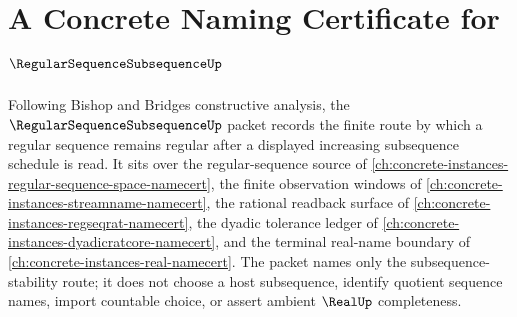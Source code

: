 \chapter{A Concrete Naming Certificate for $\RegularSequenceSubsequenceUp$}
\label{ch:concrete-instances-regular-sequence-subsequence-namecert}

Following Bishop and Bridges constructive analysis, the $\RegularSequenceSubsequenceUp$ packet records the finite route by which a regular sequence remains regular after a displayed increasing subsequence schedule is read. It sits over the regular-sequence source of \autoref{ch:concrete-instances-regular-sequence-space-namecert}, the finite observation windows of \autoref{ch:concrete-instances-streamname-namecert}, the rational readback surface of \autoref{ch:concrete-instances-regseqrat-namecert}, the dyadic tolerance ledger of \autoref{ch:concrete-instances-dyadicratcore-namecert}, and the terminal real-name boundary of \autoref{ch:concrete-instances-real-namecert}. The packet names only the subsequence-stability route; it does not choose a host subsequence, identify quotient sequence names, import countable choice, or assert ambient $\RealUp$ completeness.

